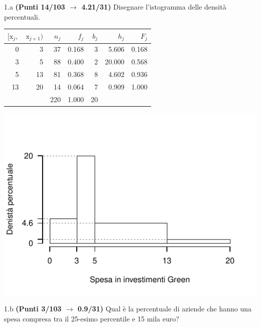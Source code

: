 \documentclass[
  11pt,
]{book}
\theoremstyle{mytheoremstyle}
\theoremstyle{mydefstyle}
\newenvironment{sol}
  {
  \begin{tcolorbox}[enhanced,breakable,arc=0.1mm,boxrule=1pt,colback=white,colframe=iblue,
  title=\bf \fontfamily{lmss}\selectfont \hspace{.5 cm} Soluzione,drop fuzzy shadow]

}{
\end{tcolorbox}
  }
\begin{document}
1.a \textbf{(Punti 14/103 \(\rightarrow\) 4.21/31)} Disegnare l'istogramma delle densità percentuali.

\begin{sol}

\begin{table}[H]
\centering
\begin{tabular}{rrrrrrr}
\toprule
$[\text{x}_j,$ & $\text{x}_{j+1})$ & $n_j$ & $f_j$ & $b_j$ & $h_j$ & $F_j$\\
\midrule
0 & 3 & 37 & 0.168 & 3 & 5.606 & 0.168\\
3 & 5 & 88 & 0.400 & 2 & 20.000 & 0.568\\
5 & 13 & 81 & 0.368 & 8 & 4.602 & 0.936\\
13 & 20 & 14 & 0.064 & 7 & 0.909 & 1.000\\
 &  & 220 & 1.000 & 20 &  & \\
\bottomrule
\end{tabular}
\end{table}

\begin{center}\includegraphics{Esami_passati_con_soluzioni_files/figure-latex/2022-68-1} \end{center}

\end{sol}

1.b \textbf{(Punti 3/103 \(\rightarrow\) 0.9/31)} Qual è la percentuale di aziende che hanno una spesa
compresa tra il 25-esimo percentile e 15 mila euro?
\end{document}
